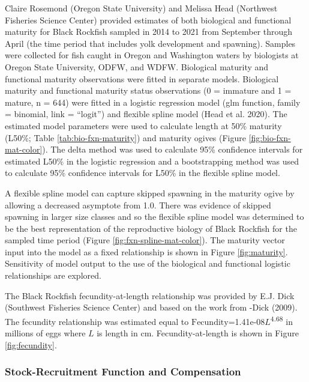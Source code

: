 \documentclass[11pt,
  english,
  letterpaper,
]{article}
\begin{document}
Claire Rosemond (Oregon State University) and Melissa Head (Northwest Fisheries Science Center) provided estimates of both biological and functional maturity for Black Rockfish sampled in 2014 to 2021 from September through April (the time period that includes yolk development and spawning). Samples were collected for fish caught in Oregon and Washington waters by biologists at Oregon State University, ODFW, and WDFW. Biological maturity and functional maturity observations were fitted in separate models. Biological maturity and functional maturity status observations (0 = immature and 1 = mature, n = 644) were fitted in a logistic regression model (glm function, family = binomial, link = ``logit'') and flexible spline model (Head et al. 2020). The estimated model parameters were used to calculate length at 50\% maturity (L50\%; Table \ref{tab:bio-fxn-maturity}) and maturity ogives (Figure \ref{fig:bio-fxn-mat-color}). The delta method was used to calculate 95\% confidence intervals for estimated L50\% in the logistic regression and a bootstrapping method was used to calculate 95\% confidence intervals for L50\% in the flexible spline model.

A flexible spline model can capture skipped spawning in the maturity ogive by allowing a decreased asymptote from 1.0. There was evidence of skipped spawning in larger size classes and so the flexible spline model was determined to be the best representation of the reproductive biology of Black Rockfish for the sampled time period (Figure \ref{fig:fxn-spline-mat-color}). The maturity vector input into the model as a fixed relationship is shown in Figure \ref{fig:maturity}. Sensitivity of model output to the use of the biological and functional logistic relationships are explored.

The Black Rockfish fecundity-at-length relationship was provided by E.J. Dick (Southwest Fisheries Science Center) and based on the work from -Dick (2009). The fecundity relationship was estimated equal to \(\text{Fecundity}\)=1.41e-08\(L\)\textsuperscript{4.68} in millions of eggs where \(L\) is length in cm. Fecundity-at-length is shown in Figure \ref{fig:fecundity}.

\hypertarget{stock-recruitment-function-and-compensation}{%
\subsubsection{Stock-Recruitment Function and Compensation}\label{stock-recruitment-function-and-compensation}}
\end{document}
